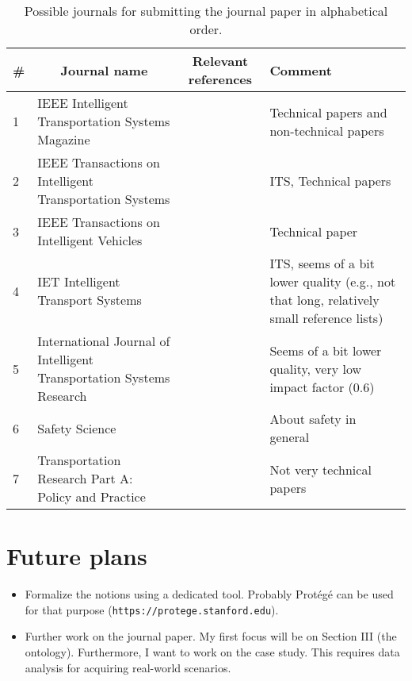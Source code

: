 \documentclass[10pt,final,a4paper,oneside,onecolumn]{article}
\newcommand{\heading}[1]{\multicolumn{1}{c}{#1}}
\begin{document}
\begin{table}[t]
	\caption{Possible journals for submitting the journal paper in alphabetical order.}
	\label{tab:journals}
	\begin{tabularx}{\textwidth}{lXlX}
		\hline
		\# & \heading{Journal name} & \heading{Relevant references} & Comment \\ \hline
		1 & IEEE Intelligent Transportation Systems Magazine & \cite{bengler2014threedecades, bertozzi2013vaic, kasper2012oobayesnetworks} &  Technical papers \cite{kasper2012oobayesnetworks} and non-technical papers \cite{bengler2014threedecades, bertozzi2013vaic} \\
		2 & IEEE Transactions on Intelligent Transportation Systems & \cite{Bonnin2014, morales2017cooperativeintersection, ploeg2017GCDC, zhao2018evaluation} & ITS, Technical papers \\
		3 & IEEE Transactions on Intelligent Vehicles & \cite{wang2017much} & Technical paper \\
		4 & IET Intelligent Transport Systems & \cite{geyer2014, wang2018compression} & ITS, seems of a bit lower quality (e.g., not that long, relatively small reference lists) \\
		5 & International Journal of Intelligent Transportation Systems Research & \cite{ebner2011identifying} & Seems of a bit lower quality, very low impact factor (0.6) \\
		6 & Safety Science & \cite{khastgir2017towards, rae2017forecast} & About safety in general\\
		7 & Transportation Research Part A: Policy and Practice & \cite{kalra2016driving, fagnant2015preparing} & Not very technical papers \\ 
		\hline
	\end{tabularx}
\end{table}

\section{Future plans}

\begin{itemize}
	\item Formalize the notions using a dedicated tool. Probably Prot{\'e}g{\'e} can be used for that purpose ({\tt https://protege.stanford.edu}).
	\item Further work on the journal paper. My first focus will be on Section III (the ontology). Furthermore, I want to work on the case study. This requires data analysis for acquiring real-world scenarios. 
\end{itemize}
%
%


\printbibliography


\newpage

\end{document}
